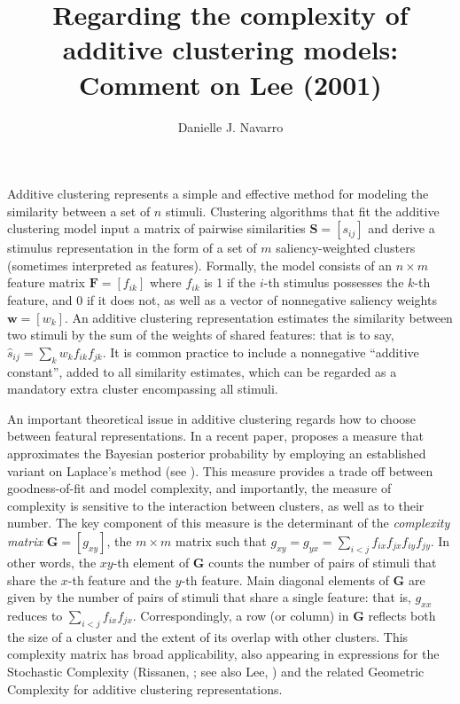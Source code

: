 \documentclass[doc,floatsintext]{apa6}
\title{Regarding the complexity of additive clustering models: Comment on Lee (2001)}
\author{\normalsize Danielle J. Navarro}
\affiliation{Department of Psychology \\ University of Adelaide}
\date{}
\newcommand{\mat}[1]{\mathbf{#1}}
\newcommand{\vect}[1]{\mathbf{#1}}
\begin{document}
\maketitle

\vspace{12pt}
Additive clustering \cite{sheara79} represents a simple and effective method for modeling the similarity between a set of $n$ stimuli. Clustering algorithms that fit the additive clustering model input a matrix of pairwise similarities $\mat{S}=[s_{ij}]$ and derive a stimulus representation in the form of a set of $m$ saliency-weighted clusters (sometimes interpreted as features). Formally, the model consists of an $n \times m$ feature matrix $\mat{F}=[f_{ik}]$ where $f_{ik}$ is 1 if the $i$-th stimulus possesses the $k$-th feature, and 0 if it does not, as well as a vector of nonnegative saliency weights $\vect{w}=[w_{k}]$. An additive clustering representation estimates the similarity between two stimuli by the sum of the weights of shared features: that is to say, $\hat{s}_{ij}=\sum_{k} w_{k}f_{ik}f_{jk}$. It is common practice to include a nonnegative ``additive constant'', added to all similarity estimates, which can be regarded as a mandatory extra cluster encompassing all stimuli.

An important theoretical issue in additive clustering regards how to choose between featural representations. In a recent paper,  proposes a measure that approximates the Bayesian posterior probability by employing an established variant on Laplace's method (see ). This measure provides a trade off between goodness-of-fit and model complexity, and importantly, the measure of complexity is sensitive to the interaction between clusters, as well as to their number. The key component of this measure is the determinant of the \emph{complexity matrix} $\mat{G}=[g_{xy}]$, the $m \times m$ matrix such that $g_{xy}=g_{yx}=\sum_{i<j} f_{ix}f_{jx}f_{iy}f_{jy}$. In other words, the $xy$-th element of $\mat{G}$ counts the number of pairs of stimuli that share the $x$-th feature and the $y$-th feature. Main diagonal elements of $\mat{G}$ are given by the number of pairs of stimuli that share a single feature: that is, $g_{xx}$ reduces to $\sum_{i<j} f_{ix}f_{jx}$. Correspondingly, a row (or column) in $\mat{G}$ reflects both the size of a cluster and the extent of its overlap with other clusters. This complexity matrix has broad applicability, also appearing in expressions for the Stochastic Complexity (Rissanen, ; see also Lee, ) and the related Geometric Complexity  \cite{myubalpit00} for additive clustering representations.
\end{document}
